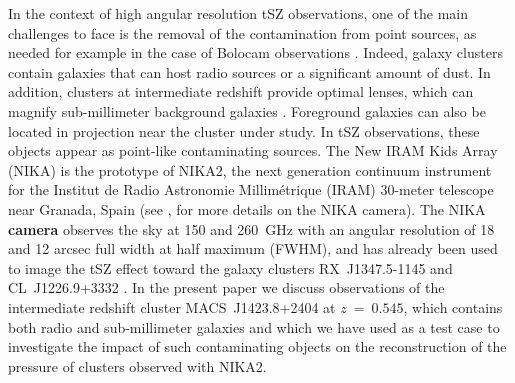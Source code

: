 \documentclass[traditabstract]{aa}
\begin{document}
In the context of high angular resolution tSZ observations, one of the main challenges to face is the removal of the contamination from point sources, as needed for example in the case of Bolocam observations \citep{sayers2013a}. Indeed, galaxy clusters contain galaxies that can host radio sources or a significant amount of dust. In addition, clusters at intermediate redshift provide optimal lenses, which can magnify sub-millimeter background galaxies \citep[see, e.g.,][]{adam2014}. Foreground galaxies can also be located in projection near the cluster under study. In tSZ observations, these objects appear as point-like contaminating sources.  The New IRAM Kids Array (NIKA) is the prototype of NIKA2, the next generation continuum instrument for the Institut de Radio Astronomie Millim\'etrique (IRAM) 30-meter telescope near Granada, Spain (see \citealt{monfardini2010,bourion2011,bourrion2012,monfardini2011,calvo2012,catalano2014}, for more details on the NIKA camera). The NIKA {\bf camera} observes the sky at 150 and 260~GHz with an angular resolution of 18 and 12 arcsec full width at half maximum (FWHM), and has already been used to image the tSZ effect toward the galaxy clusters \mbox{RX~J1347.5-1145} and \mbox{CL~J1226.9+3332} \citep[see][]{adam2013,adam2014}. In the present paper we discuss observations of  the intermediate redshift cluster \mbox{MACS~J1423.8+2404} at $z~=~0.545$, which contains both radio and sub-millimeter galaxies and which we have used as a test case to investigate the impact of such contaminating objects on the reconstruction of the pressure of clusters observed with NIKA2. 
\end{document}

